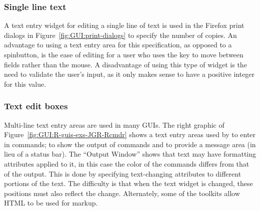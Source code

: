 \subsubsection{Single line text}
\label{sec:GUI:single-line-text}

A text entry widget for editing a single line of text is used in the
Firefox print dialogs in Figure~\ref{fig:GUI:print-dialogs} to specify
the number of copies. An advantage to using a text entry area for this
specification, as opposed to a spinbutton, is the ease of editing for
a user who uses the  key to move between fields rather than
the mouse. A disadvantage of using this type of widget is the need to
validate the user's input, as it only makes sense to have a positive
integer for this value.

\subsubsection{Text edit boxes}
\label{sec:GUI:textboxes}

Multi-line text entry areas are used in many GUIs. The right graphic
of Figure~\ref{fig:GUI:R-guis-exs-JGR-Rcmdr} shows a text entry areas
used by  to enter in \R\/ commands; to show the output of
\R\/ commands and to provide a message area (in lieu of a status
bar). The ``Output Window'' shows that text may have formatting
attributes applied to it, in this case the color of the commands
differs from that of the output. This is done by specifying
text-changing attributes to different portions of the text. The
difficulty is that when the text widget is changed, these positions
must also reflect the change. Alternately, some of the toolkits allow
HTML to be used for markup.


